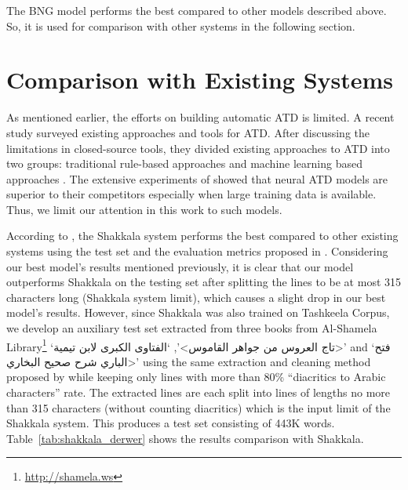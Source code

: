 \documentclass[11pt,a4paper]{article}
\begin{document}
The BNG model performs the best compared to other models described above. So, it is used for comparison with other systems in the following section.

\section{Comparison with Existing Systems}
\label{sec:comparison}

As mentioned earlier, the efforts on building automatic ATD is limited. A recent study \cite{dataset} surveyed existing approaches and tools for ATD. After discussing the limitations in closed-source tools, they divided existing approaches to ATD into two groups:
traditional rule-based approaches \cite{zitouni2009arabic,pasha2014madamira,shahrour2015improving,alnefaie2017automatic,bebah2014hybrid,azmi2015survey,chennoufi2017morphological,darwish2017arabic,fashwan2017shakkil,alqahtani2019homograph}
and machine learning based approaches \cite{belinkov2015arabic,abandah2015automatic,abandah2017investigating,shakkala,moumen2018evaluation,mubarak2019highly}. The extensive experiments of \cite{dataset} showed that neural ATD models are superior to their competitors especially when large training data is available. Thus, we limit our attention in this work to such models.

According to \cite{dataset}, the Shakkala system \cite{shakkala} performs the best compared to other existing systems using the test set and the evaluation metrics proposed in \cite{dataset}. Considering our best model's results mentioned previously, it is clear that our model outperforms Shakkala on the testing set after splitting the lines to be at most 315 characters long (Shakkala system limit), which causes a slight drop in our best model's results. However, since Shakkala was also trained on Tashkeela Corpus, we develop an auxiliary test set extracted from three books from Al-Shamela Library\footnote{\url{http://shamela.ws}}
`\<تاج العروس من جواهر القاموس>', `\<الفتاوى الكبرى لابن تيمية>' and `\<فتح الباري شرح صحيح البخاري>'
using the same extraction and cleaning method proposed by \cite{dataset} while keeping only lines with more than 80\% ``diacritics to Arabic characters'' rate. The extracted lines are each split into lines of lengths no more than 315 characters (without counting diacritics) which is the input limit of the Shakkala system. This produces a test set consisting of 443K words. Table~\ref{tab:shakkala_derwer} shows the results comparison with Shakkala.
\end{document}
